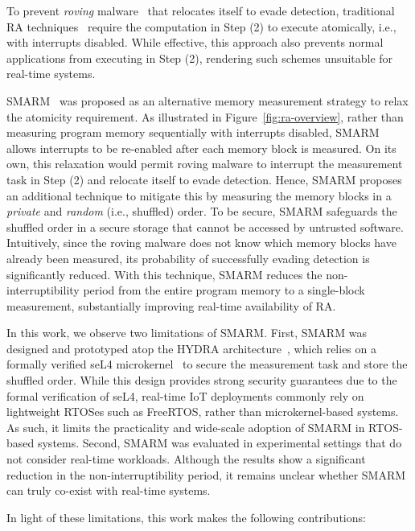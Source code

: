 \documentclass{ieeeaccess}
\begin{document}
To prevent \emph{roving} malware~\cite{smarm} that relocates itself to evade detection, traditional RA techniques~\cite{smart,hydra,vrased} require the computation in Step (2) to execute atomically, i.e., with interrupts disabled.
While effective, this approach also prevents normal applications from executing in Step (2), rendering such schemes unsuitable for real-time systems.

SMARM~\cite{smarm} was proposed as an alternative memory measurement strategy to relax the atomicity requirement.
As illustrated in Figure~\ref{fig:ra-overview}, rather than measuring program memory sequentially with interrupts disabled, SMARM allows interrupts to be re-enabled after each memory block is measured.
On its own, this relaxation would permit roving malware to interrupt the measurement task in Step (2) and relocate itself to evade detection.
Hence, SMARM proposes an additional technique to mitigate this by measuring the memory blocks in a \emph{private} and \emph{random} (i.e., shuffled) order.
To be secure, SMARM safeguards the shuffled order in a secure storage that cannot be accessed by untrusted software.
Intuitively, since the roving malware does not know which memory blocks have already been measured, its probability of successfully evading detection is significantly reduced.
With this technique, SMARM reduces the non-interruptibility period from the entire program memory to a single-block measurement, substantially improving real-time availability of RA.

In this work, we observe two limitations of SMARM.
First, SMARM was designed and prototyped atop the HYDRA architecture~\cite{hydra}, which relies on a formally verified seL4 microkernel~\cite{sel4} to secure the measurement task and store the shuffled order.
While this design provides strong security guarantees due to the formal verification of seL4, real-time IoT deployments commonly rely on lightweight RTOSes such as FreeRTOS, rather than microkernel-based systems.
As such, it limits the practicality and wide-scale adoption of SMARM in RTOS-based systems.
Second, SMARM was evaluated in experimental settings that do not consider real-time workloads.
Although the results show a significant reduction in the non-interruptibility period, it remains unclear whether SMARM can truly co-exist with real-time systems.

In light of these limitations, this work makes the following contributions:
\end{document}
